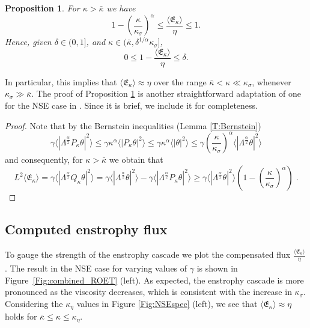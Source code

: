 \documentclass[twoside, reqno]{amsart}
\numberwithin{lemma}{section}
\numberwithin{theorem}{section}
\newtheorem{proposition}{Proposition}
\numberwithin{proposition}{section}
\numberwithin{equation}{section} %
\newcommand{\te}{\theta}
\newcommand{\ga}{\gamma}
\newcommand{\la}{\Lambda}
\newcommand{\E}{\mathfrak{E}}
\newcommand{\bkap}{\bar{\kap}}
\newcommand{\kap}{\kappa}
\begin{document}
\begin{proposition}
    \label{main_prop1}
For ${\kap>\bkap}$ we have
\begin{equation} \label{main:ROETsidethem}
    1-\left(\frac{\kappa}{\kappa_{\sigma}}\right)^{\alpha}
    \leq \frac{\langle \E_{\kappa}\rangle}{\eta} \leq 1 .
\end{equation}
Hence, given $\delta \in (0,1]$, and $\kappa \in (\bkap, \delta^{1/\alpha}\kappa_{\sigma}]$, 
\begin{equation*}
   0 \le 1 - \frac{\langle \E_{\kappa}\rangle}{\eta} \leq \delta .
\end{equation*}
\end{proposition} 
{In particular, this implies that
$ \langle \E_{\kappa}\rangle \approx \eta $ over the range ${\bkap < \kappa \ll \kappa_{\sigma}}$, whenever ${\kappa_{\sigma} \gg \bkap}$}.  The proof of Proposition 
\ref{main_prop1} is another straightforward adaptation of one for the NSE case in \cite{FJMR2002}.  Since it is brief, we include it for completeness.

\begin{proof}
Note that by the {Bernstein inequalities (Lemma \ref{T:Bernstein})}
\begin{equation*}
    \ga\langle|\la^{\frac{\alpha}{2}} P_{\kappa}\te|^2\rangle \leq \ga \kappa^{\alpha} \langle|P_{\kappa}\te|^2\rangle \leq  \ga \kappa^{\alpha}\langle|\te|^2\rangle \leq \ga \left(\frac{\kappa}{\kappa_{\sigma}}\right)^{\alpha}\langle|\la^{\frac{\alpha}{2}}\te|^2\rangle
\end{equation*}
and consequently, for $\kappa > \bkap$ we obtain that
\begin{equation*}
    L^2\langle \E_{\kappa}\rangle = \ga \langle|\la^{\frac{\alpha}{2}} Q_{\kappa}\te|^2\rangle = \ga \langle|\la^{\frac{\alpha}{2}}\te|^2\rangle - \ga \langle|\la^{\frac{\alpha}{2}} P_{\kappa}\te|^2\rangle \geq \ga \langle|\la^{\frac{\alpha}{2}}\te|^2\rangle \left(1-\left(\frac{\kappa}{\kappa_{\sigma}}\right)^{\alpha}\right)\;.
\end{equation*}
\end{proof}

\subsection{Computed enstrophy flux}

To gauge the strength of the enstrophy cascade we plot the compensated flux $\frac{\langle \E_{\kappa} \rangle}{\eta}$.
The result in the NSE case for varying values of $\gamma$ is shown in Figure~\ref{Fig:combined_ROET} (left).  As expected, the enstrophy cascade is more pronounced as the viscosity decreases, which is consistent with the increase in $\kappa_\sigma$.  Considering the $\kappa_\eta$ values in Figure \ref{Fig:NSEspec} (left), we see that ${\langle \E_{\kappa} \rangle}\approx {\eta}$ holds
for $\bar\kappa \le \kappa \le \kappa_\eta$.
\end{document}
